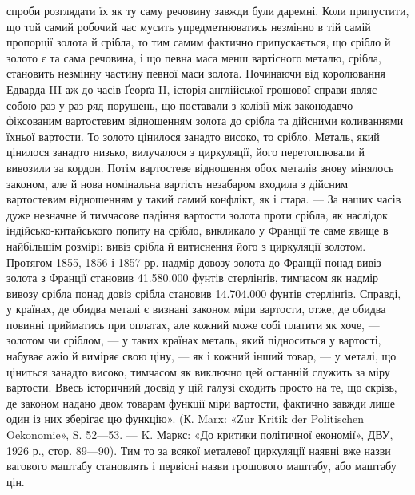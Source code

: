 спроби розглядати їх як ту саму речовину завжди були даремні. Коли припустити, що той самий робочий
час мусить упредметнюватись незмінно в тій самій пропорції золота й срібла, то тим самим фактично
припускається, що срібло й золото є та сама речовина, і що певна маса менш вартісного металю,
срібла, становить незмінну частину певної маси золота. Починаючи від королювання Едварда III аж до
часів Ґеорґа II, історія англійської грошової справи являє собою раз-у-раз ряд порушень, що
поставали з колізії між законодавчо фіксованим вартостевим відношенням
золота до срібла та дійсними коливаннями їхньої вартости. То золото цінилося занадто високо, то
срібло. Металь, який цінилося занадто низько, вилучалося з циркуляції, його перетоплювали й вивозили
за кордон. Потім вартостеве відношення обох металів знову мінялось законом, але й нова номінальна
вартість незабаром входила з дійсним вартостевим відношенням у такий самий конфлікт, як і стара. —
За наших часів дуже
незначне й тимчасове падіння вартости золота проти срібла, як наслідок індійсько-китайського попиту
на срібло, викликало у Франції те саме явище в найбільшім розмірі: вивіз срібла й витиснення його з
циркуляції золотом. Протягом 1855, 1856 і 1857 рр. надмір довозу золота до Франції понад вивіз
золота з Франції становив 41.580.000 фунтів стерлінґів, тимчасом як надмір вивозу срібла понад довіз
срібла становив 14.704.000 фунтів стерлінґів. Справді, у країнах, де обидва металі є визнані законом
міри вартости, отже, де обидва повинні прийматись при оплатах, але кожний може собі платити як хоче,
— золотом чи сріблом, — у таких країнах металь, який підноситься у вартості, набуває ажіо й виміряє
свою ціну, — як і кожний інший товар, — у металі, що ціниться занадто високо, тимчасом як виключно
цей останній служить за міру вартости. Ввесь історичний досвід у цій галузі сходить просто на те, що
скрізь, де законом надано двом товарам функції міри вартости, фактично завжди лише один із них
зберігає цю функцію». (К. Marx: «Zur Kritik der Politischen Oekonomie», S. 52—53. — K. Маркс: «До
критики політичної економії», ДВУ, 1926 р., стор. 89—90).
Тим то за всякої металевої циркуляції наявні вже назви вагового
маштабу становлять і первісні назви грошового маштабу,
або маштабу цін.

